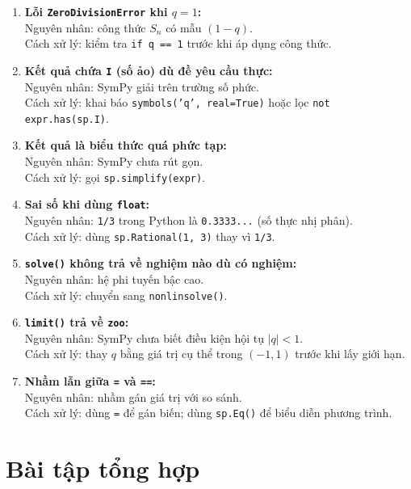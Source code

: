 \documentclass[12pt,a4paper]{report}
\begin{document}
\begin{enumerate}
  \item \textbf{Lỗi \texttt{ZeroDivisionError} khi $q = 1$:}\\
  Nguyên nhân: công thức $S_n$ có mẫu $(1 - q)$.\\
  Cách xử lý: kiểm tra \texttt{if q == 1} trước khi áp dụng công thức.

  \item \textbf{Kết quả chứa \texttt{I} (số ảo) dù đề yêu cầu thực:}\\
  Nguyên nhân: SymPy giải trên trường số phức.\\
  Cách xử lý: khai báo \texttt{symbols('q', real=True)} hoặc lọc
  \texttt{not expr.has(sp.I)}.

  \item \textbf{Kết quả là biểu thức quá phức tạp:}\\
  Nguyên nhân: SymPy chưa rút gọn.\\
  Cách xử lý: gọi \texttt{sp.simplify(expr)}.

  \item \textbf{Sai số khi dùng \texttt{float}:}\\
  Nguyên nhân: \texttt{1/3} trong Python là \texttt{0.3333...} (số thực
  nhị phân).\\
  Cách xử lý: dùng \texttt{sp.Rational(1, 3)} thay vì \texttt{1/3}.

  \item \textbf{\texttt{solve()} không trả về nghiệm nào dù có nghiệm:}\\
  Nguyên nhân: hệ phi tuyến bậc cao.\\
  Cách xử lý: chuyển sang \texttt{nonlinsolve()}.

  \item \textbf{\texttt{limit()} trả về \texttt{zoo}:}\\
  Nguyên nhân: SymPy chưa biết điều kiện hội tụ $|q| < 1$.\\
  Cách xử lý: thay $q$ bằng giá trị cụ thể trong $(-1, 1)$ trước khi
  lấy giới hạn.

  \item \textbf{Nhầm lẫn giữa \texttt{=} và \texttt{==}:}\\
  Nguyên nhân: nhầm gán giá trị với so sánh.\\
  Cách xử lý: dùng \texttt{=} để gán biến; dùng \texttt{sp.Eq()} để
  biểu diễn phương trình.
\end{enumerate}

\chapter{Bài tập tổng hợp}
\end{document}
